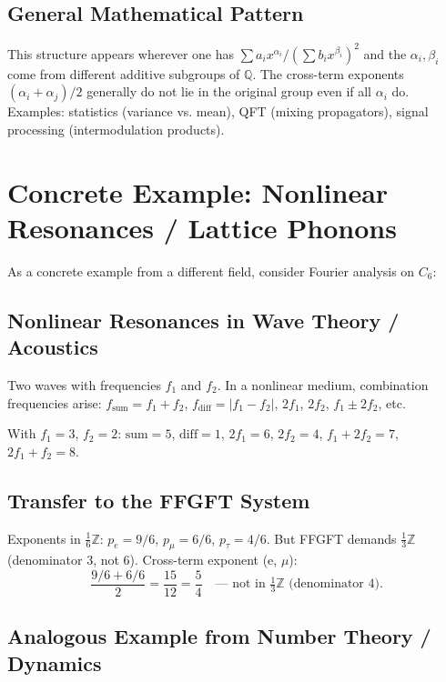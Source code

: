 \subsection{General Mathematical Pattern}

This structure appears wherever one has $\sum a_ix^{\alpha_i}/(\sum b_ix^{\beta_i})^2$
and the $\alpha_i,\beta_i$ come from different additive subgroups of $\mathbb{Q}$.
The cross-term exponents $(\alpha_i+\alpha_j)/2$ generally do not lie in the
original group even if all $\alpha_i$ do. Examples: statistics (variance vs. mean),
QFT (mixing propagators), signal processing (intermodulation products).

\section{Concrete Example: Nonlinear Resonances / Lattice Phonons}

As a concrete example from a different field, consider Fourier analysis on $C_6$:

\subsection{Nonlinear Resonances in Wave Theory / Acoustics}

Two waves with frequencies $f_1$ and $f_2$.
In a nonlinear medium, combination frequencies arise:
$f_{\text{sum}}=f_1+f_2$, $f_{\text{diff}}=|f_1-f_2|$,
$2f_1$, $2f_2$, $f_1\pm2f_2$, etc.

With $f_1=3$, $f_2=2$:
$\text{sum}=5$, $\text{diff}=1$, $2f_1=6$, $2f_2=4$,
$f_1+2f_2=7$, $2f_1+f_2=8$.

\subsection{Transfer to the FFGFT System}

Exponents in $\tfrac{1}{6}\mathbb{Z}$: $p_e=9/6$, $p_\mu=6/6$, $p_\tau=4/6$.
But FFGFT demands $\tfrac{1}{3}\mathbb{Z}$ (denominator 3, not 6).
Cross-term exponent (e, $\mu$):
\[
  \frac{9/6+6/6}{2}=\frac{15}{12}=\frac{5}{4}
  \quad\text{--- not in }\tfrac{1}{3}\mathbb{Z}\text{ (denominator 4).}
\]

\subsection{Analogous Example from Number Theory / Dynamics}

